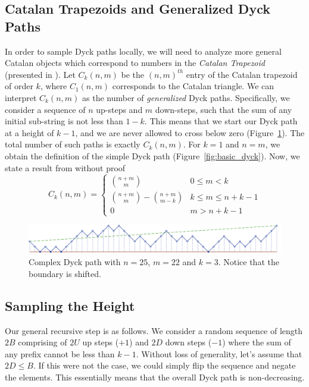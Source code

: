 \subsection{Catalan Trapezoids and Generalized Dyck Paths}
In order to sample Dyck paths locally, we will need to analyze more general Catalan objects
which correspond to numbers in the \textit{Catalan Trapezoid} (presented in \cite{trap}).
Let $C_k(n,m)$ be the $(n,m)^{th}$ entry of the Catalan trapezoid of order $k$, where $C_1(n,m)$ corresponds to the Catalan triangle.
We can interpret $C_k(n,m)$ as  the number of \emph{generalized} Dyck paths.
Specifically, we consider a sequence of $n$ up-steps and $m$ down-steps, such that the sum of any initial sub-string is not less than $1-k$.
This means that we start our Dyck path at a height of $k-1$, and we are never allowed to cross below zero (Figure~\ref{fig:complex_dyck}).
The total number of such paths is exactly $C_k(n,m)$.
For $k = 1$ and $n=m$, we obtain the definition of the simple Dyck path (Figure~\ref{fig:basic_dyck}).
Now, we state a result from \cite{trap} without proof
$$
C_k(n,m)=
\begin{cases}
{n+m}\choose m &0\le m<k\\
{{n+m}\choose{m}} - {{n+m}\choose{m-k}} &k\le m\le n+k-1\\
0 &m>n+k-1
\end{cases}
$$

\begin{figure}[htbp]
    \centering
    \includegraphics[width=\textwidth]{images/complex_dyck_path.pdf}
    \caption{Complex Dyck path with $n = 25$, $m = 22$ and $k = 3$.
             Notice that the boundary is shifted.} \label{fig:complex_dyck}
\end{figure}

\subsection{Sampling the Height}
Our general recursive step is as follows.
We consider a random sequence of length $2B$ comprising of $2U$ up steps ($+1$) and $2D$ down steps ($-1$)
where the sum of any prefix cannot be less than $k-1$.
Without loss of generality, let's assume that $2D\le B$. If this were not the case, we could simply flip the sequence and negate the elements.
This essentially means that the overall Dyck path is non-decreasing.


